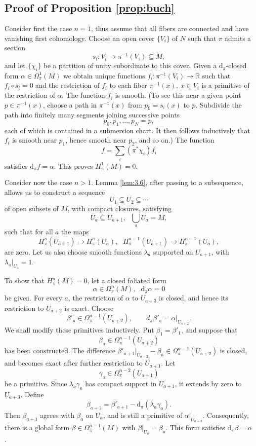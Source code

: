 \documentclass[11pt]{amsart}
\theoremstyle{definition}
\theoremstyle{remark}
\newcommand{\R}{\mathbb{R}}
\renewcommand{\d}{{\mbox{d}}}
\newcommand{\ol}{\overline}
\renewcommand{\subset}{\subseteq}
\begin{document}
\subsection{Proof of Proposition \ref{prop:buch}} \label{subsec:buch}
Consider first the case $n=1$, thus assume that all fibers are connected and have vanishing first cohomology. 
Choose an open cover $\{V_i\}$ of $N$ such that $\pi$ admits a
section
\[s_i\colon V_i\to \pi^{-1}(V_i)\subset  M,\]
and let $\{\chi_i\}$ be a partition of unity subordinate to this cover. Given a $\d_\pi$-closed form 
 $\alpha\in\Omega^1_\pi(M)$  we obtain unique functions $f_i\colon \pi^{-1}(V_i)\to \R$ such that $f_i\circ s_i=0$ and 
the restriction of $f_i$ to each fiber $\pi^{-1}(x),\ x\in V_i$ is a primitive of the restriction of  $\alpha$. The function $f_i$ is smooth. (To see this near a given point $p\in \pi^{-1}(x)$, choose a path in $\pi^{-1}(x)$  from $p_0=s_i(x)$ to $p$. 
Subdivide the path into finitely many segments joining successive
points
\[
p_0,p_1,\ldots,p_N=p,
\]
 each of which is contained in a submersion chart. It then follows inductively that $f_i$ is smooth near $p_1$, hence 
smooth near $p_2$, and so on.)  The function 
\[
f=\sum_i (\pi^*\chi_i)f_i
\]
satisfies $\d_\pi f=\alpha$. This proves $H^1_\pi(M)=0$.

Consider now the case $n>1$. Lemma \ref{lem:3.6}, after passing to a subsequence, allows us to construct a sequence 
\[ U_1\subset U_2\subset \cdots \]
of open subsets of $M$, with compact closures, satisfying 
\[ \ol{U}_a\subset U_{a+1},\ \ \ \bigcup_a U_a=M,\] 
such that for all $a$ the maps 
	\[ H^n_\pi(U_{a+1})\to H^n_\pi(U_a),\ \ \ H^{n-1}_\pi(U_{a+1})\to H^{n-1}_\pi(U_a),
	\]
are zero. Let us also choose smooth functions $\lambda_a$ supported on $U_{a+1}$, with $\lambda_a|_{U_a}=1$. 

To show that $H^n_\pi(M)=0$, let a closed foliated form
\[ \alpha\in \Omega^n_\pi(M),\ \ \ \d_\pi\alpha=0\] 
be given. For every $a$, the restriction of $\alpha$ to $U_{a+3}$ is closed,
and hence its restriction to $U_{a+2}$ is exact. Choose
\[
\beta'_a\in\Omega^{n-1}_\pi(U_{a+2}),
\qquad
d_\pi\beta'_a=\alpha|_{U_{a+2}}.
\]
We shall modify these primitives inductively. Put
$\beta_1=\beta'_1$, and suppose that
\[
\beta_a\in\Omega^{n-1}_\pi(U_{a+2})
\]
has been constructed.  The difference $\beta'_{a+1}|_{U_{a+2}}-\beta_a\in \Omega^{n-1}_\pi(U_{a+2})$ is closed, and becomes exact after further restriction to $U_{a+1}$. Let 	
\[ \gamma_a\in \Omega_\pi^{n-2}(U_{a+1})\] 
be a primitive. Since $\lambda_a\gamma_a$ has compact support in $U_{a+1}$, it
extends by zero to $U_{a+3}$. Define
\[ \beta_{a+1}=\beta'_{a+1}-\d_\pi(\lambda_a \gamma_a).\]
Then $\beta_{a+1}$ agrees with $\beta_a$ on $U_a$, and is still a primitive of $\alpha|_{U_{a+3}}$. 
Consequently, there is a global form $\beta\in \Omega^{n-1}_\pi(M)$ with $\beta|_{U_a}=\beta_a$. 
This form  satisfies $\d_\pi\beta=\alpha$.  \qedhere
\end{document}
